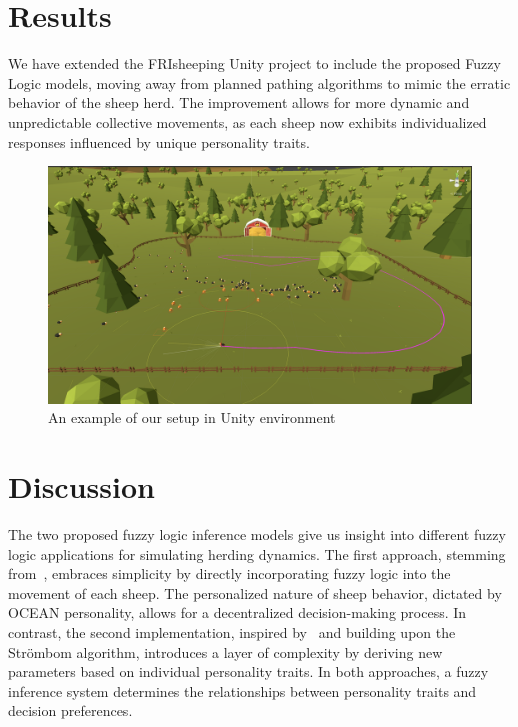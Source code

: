 \documentclass[9pt]{pnas-new}
\begin{document}
\section*{Results}
We have extended the FRIsheeping Unity project to include the proposed Fuzzy Logic models, moving away from planned pathing algorithms to mimic the erratic behavior of the sheep herd. The improvement allows for more dynamic and unpredictable collective movements, as each sheep now exhibits individualized responses influenced by unique personality traits.

\begin{figure}[H]
    \centering
    \includegraphics[width=\columnwidth]{fig/strombom2.png}
    \caption{An example of our setup in Unity environment}
\end{figure}


\section*{Discussion}
The two proposed fuzzy logic inference models give us insight into different fuzzy logic applications for simulating herding dynamics. The first approach, stemming from~\cite{bajec2003boids}, embraces simplicity by directly incorporating fuzzy logic into the movement of each sheep. The personalized nature of sheep behavior, dictated by OCEAN personality, allows for a decentralized decision-making process. In contrast, the second implementation, inspired by~\cite{fuzzylogic} and building upon the Str\"{o}mbom algorithm, introduces a layer of complexity by deriving new parameters based on individual personality traits. In both approaches, a fuzzy inference system determines the relationships between personality traits and decision preferences.


\end{document}
